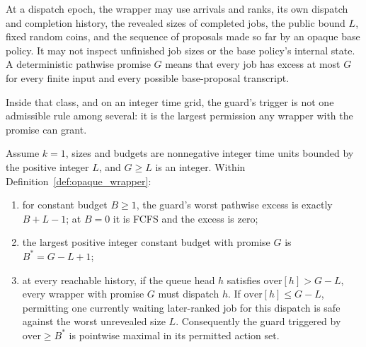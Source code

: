 \documentclass[mathematics,supfile,submit,moreauthors]{Definitions/mdpi}
\begin{document}
\begin{definition}
\label{def:opaque_wrapper}
At a dispatch epoch, the wrapper may use arrivals and ranks, its own dispatch and
completion history, the revealed sizes of completed jobs, the public bound $L$,
fixed random coins, and the sequence of proposals made so far by an opaque base
policy. It may not inspect unfinished job sizes or the base policy's internal
state. A deterministic pathwise promise $G$ means that every job has excess at
most $G$ for every finite input and every possible base-proposal transcript.
\end{definition}

Inside that class, and on an integer time grid, the guard's trigger is not one
admissible rule among several: it is the largest permission any wrapper with the
promise can grant.

\begin{proposition}
\label{thm:k1_maximal}
Assume $k=1$, sizes and budgets are nonnegative integer time units bounded by the
positive integer $L$, and $G\geq L$ is an integer. Within
Definition~\ref{def:opaque_wrapper}:
\begin{enumerate}
\item for constant budget $B\geq1$, the guard's worst pathwise excess is exactly
$B+L-1$; at $B=0$ it is FCFS and the excess is zero;
\item the largest positive integer constant budget with promise $G$ is
$B^*=G-L+1$;
\item at every reachable history, if the queue head $h$ satisfies
$\mathrm{over}[h]>G-L$, every wrapper with promise $G$ must dispatch $h$.
If $\mathrm{over}[h]\leq G-L$, permitting one currently waiting later-ranked
job for this dispatch is safe against the worst unrevealed size $L$.
Consequently the guard triggered by $\mathrm{over}\geq B^*$ is pointwise maximal
in its permitted action set.
\end{enumerate}
\end{proposition}
\end{document}
